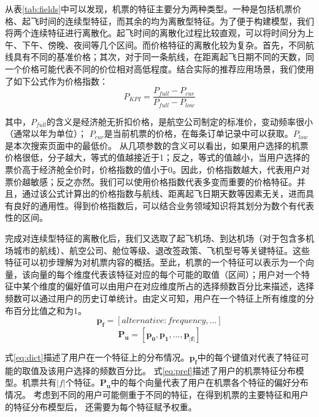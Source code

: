 从表\ref{tab:fields}中可以发现，机票的特征主要分为两种类型。一种是包括机票价格、起飞时间的连续型特征，而其余的均为离散型特征。为了便于构建模型，我们将两个连续特征进行离散化。起飞时间的离散化过程比较直观，可以将时间分为上午、下午、傍晚、夜间等几个区间。而价格特征的离散化较为复杂。首先，不同航线具有不同的基准价格；其次，对于同一条航线，在距离起飞日期不同的天数，同一个价格可能代表不同的价位相对高低程度。结合实际的推荐应用场景，我们使用了如下公式作为价格指数：\\
\begin{equation}
	P_{KPI} = \frac{P_{full} - P_{cur}}{P_{full} - P_{low}}
\end{equation}\par
其中，$P_{full}$的含义是经济舱无折扣价格，是航空公司制定的标准价，变动频率很小（通常以年为单位）；
$P_{cur}$是当前机票的价格，在每条订单记录中可以获取。$P_{low}$是本次搜索页面中的最低价。
从几项参数的含义可以看出，如果用户选择的机票价格很低，分子越大，等式的值越接近于1；反之，等式的值越小，当用户选择的票价高于经济舱全价时，价格指数的值小于0。因此，价格指数越大，代表用户对票价越敏感；反之亦然。我们可以使用价格指数代表多变而重要的价格特征。并且，通过该公式计算出的价格指数与航线、距离起飞日期天数等因素无关，进而具有良好的通用性。得到价格指数后，可以结合业务领域知识将其划分为数个有代表性的区间。\par
完成对连续型特征的离散化后，我们又选取了起飞机场、到达机场（对于包含多机场城市的航线）、航空公司、舱位等级、退改签政策、飞机型号等关键特征。这些特征可以初步理解为对机票内容的概括。至此，机票的一个特征可以表示为一个向量，该向量的每个维度代表该特征对应的每个可能的取值（区间）；用户对一个特征中某个维度的偏好值可以由用户在对应维度所占的选择频数百分比来描述，选择频数可以通过用户的历史订单统计。由定义可知，用户在一个特征上所有维度的分布百分比值之和为1。\\

\begin{equation}
\label{eq:dict}
	\mathbf{p_f} = [alternative:frequency,\dots]
\end{equation}
\begin{equation}
\label{eq:pref}
	\mathbf{P_u} = [\mathbf{p_0},\mathbf{p_1},\dots,\mathbf{p_{|f|}}]
\end{equation}\par
式\ref{eq:dict}描述了用户在一个特征上的分布情况。$\mathbf{p_f}$中的每个键值对代表了特征可能的取值及该用户选择的频数百分比。
式\ref{eq:pref}描述了用户的机票特征分布模型。机票共有$|f|$个特征。$\mathbf{P_u}$中的每个向量代表了用户在机票各个特征的偏好分布情况。
考虑到不同的用户可能侧重于不同的特征，在得到机票的主要特征和用户的特征分布模型后，
还需要为每个特征赋予权重。

